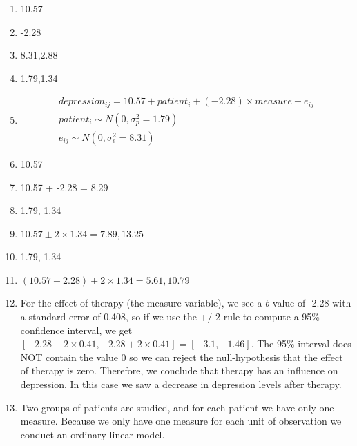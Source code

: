 \documentclass[]{book}\usepackage[]{graphicx}\usepackage[]{color}
\begin{document}
\begin{enumerate}

\item  10.57 \\
\item  -2.28 \\
\item  8.31,2.88 \\
\item  1.79,1.34 \\

\item 
\begin{eqnarray}
depression_{ij} = 10.57 + patient_i + (-2.28) \times measure + e_{ij} \\
patient_i \sim N(0, \sigma_p^2 = 1.79)\\
e_{ij} \sim N(0, \sigma_e^2 = 8.31)
\end{eqnarray}




\item  10.57\\
\item  10.57 + -2.28  = 8.29\\
\item  1.79, 1.34 \\

\item  $10.57 \pm 2 \times 1.34 = {7.89, 13.25}$\\

\item  1.79, 1.34 \\

\item  $(10.57 -2.28)  \pm  2 \times 1.34 = {5.61, 10.79 }   $\\

\item  For the effect of therapy (the measure variable), we see a $b$-value of -2.28 with a standard error of 0.408, so if we use the +/-2 rule to compute a 95\% confidence interval, we get $[ -2.28 - 2\times 0.41 , -2.28 + 2\times 0.41]  = [ -3.1 ,  -1.46]$. The 95\% interval does NOT contain the value 0 so we can reject the null-hypothesis that the effect of therapy is zero. Therefore, we conclude that therapy has an influence on depression. In this case we saw a decrease in depression levels after therapy.

\item  Two groups of patients are studied, and for each patient we have only one measure. Because we only have one measure for each unit of observation we conduct an ordinary linear model.


\end{enumerate}
\end{document}
